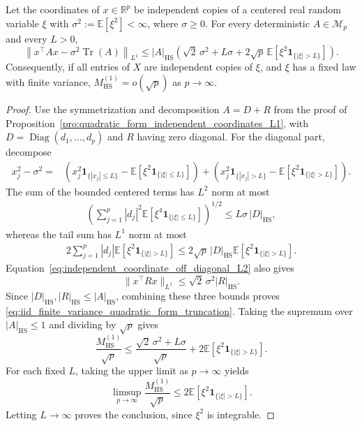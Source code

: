 \documentclass[EJP, preprint, NODS, nobera, nofontexpansion]{ejpecp}
\DeclareMathOperator{\tr}{Tr}
\DeclareMathOperator{\diag}{Diag}
\DeclareMathOperator{\hs}{HS}
\begin{document}
\begin{proposition}
\label{pro:quadratic_form_finite_variance}
Let the coordinates of $x\in\mathbb R^p$ be independent copies of a
centered real random variable $\xi$ with $\sigma^2:=\mathbb E[\xi^2]<\infty$,
where $\sigma\geq0$.
For every deterministic $A\in\mathcal M_p$ and every $L>0$,
\begin{equation}
    \left\|x^\top Ax-\sigma^2\tr(A)\right\|_{L^1}
    \leq
    |A|_{\hs}\left(
        \sqrt2\,\sigma^2+L\sigma
        +2\sqrt p\,
          \mathbb E\!\left[\xi^2\mathbf1_{\{|\xi|>L\}}\right]
    \right).
    \label{eq:iid_finite_variance_quadratic_form_truncation}
\end{equation}
Consequently, if all entries of $X$ are independent copies of $\xi$, and $\xi$ has a fixed law with finite variance,
$M_{\hs}^{(1)}=o(\sqrt p)$ as $p\to\infty$.
\end{proposition}

\begin{proof}
Use the symmetrization and decomposition
$A=D+R$ from the proof of
Proposition~\ref{pro:quadratic_form_independent_coordinates_L1}, with
$D=\diag(d_1,\ldots,d_p)$ and $R$ having zero diagonal.
For the diagonal part, decompose
\begin{align*}
    x_j^2-\sigma^2
    ={}&
    \left(
      x_j^2\mathbf1_{\{|x_j|\leq L\}}
      -\mathbb E\left[\xi^2\mathbf1_{\{|\xi|\leq L\}}\right]
    \right)
    +\left(
      x_j^2\mathbf1_{\{|x_j|>L\}}
      -\mathbb E\left[\xi^2\mathbf1_{\{|\xi|>L\}}\right]
    \right).
\end{align*}
The sum of the bounded centered terms has $L^2$ norm at most
\begin{align*}
    \left(
      \sum_{j=1}^p|d_j|^2
      \mathbb E\left[\xi^4\mathbf1_{\{|\xi|\leq L\}}\right]
    \right)^{1/2}
    \leq L\sigma\,|D|_{\hs},
\end{align*}
whereas the tail sum has $L^1$ norm at most
\begin{align*}
    2\sum_{j=1}^p|d_j|
      \mathbb E\left[\xi^2\mathbf1_{\{|\xi|>L\}}\right]
    \leq
    2\sqrt p\,|D|_{\hs}
      \mathbb E\left[\xi^2\mathbf1_{\{|\xi|>L\}}\right].
\end{align*}
Equation~\eqref{eq:independent_coordinate_off_diagonal_L2} also gives
\[
    \|x^\top Rx\|_{L^1}\leq\sqrt2\,\sigma^2|R|_{\hs}.
\]
Since $|D|_{\hs},|R|_{\hs}\leq|A|_{\hs}$, combining these three bounds
proves \eqref{eq:iid_finite_variance_quadratic_form_truncation}.
Taking the supremum over \(|A|_{\hs}\leq1\) and dividing by
\(\sqrt p\) gives
\[
    \frac{M_{\hs}^{(1)}}{\sqrt p}
    \leq
    \frac{\sqrt2\,\sigma^2+L\sigma}{\sqrt p}
    +2\mathbb E\!\left[\xi^2\mathbf1_{\{|\xi|>L\}}\right].
\]
For each fixed \(L\), taking the upper limit as \(p\to\infty\) yields
\[
    \limsup_{p\to\infty}\frac{M_{\hs}^{(1)}}{\sqrt p}
    \leq
    2\mathbb E\!\left[\xi^2\mathbf1_{\{|\xi|>L\}}\right].
\]
Letting \(L\to\infty\) proves the conclusion, since \(\xi^2\)
is integrable.
\end{proof}
\end{document}
